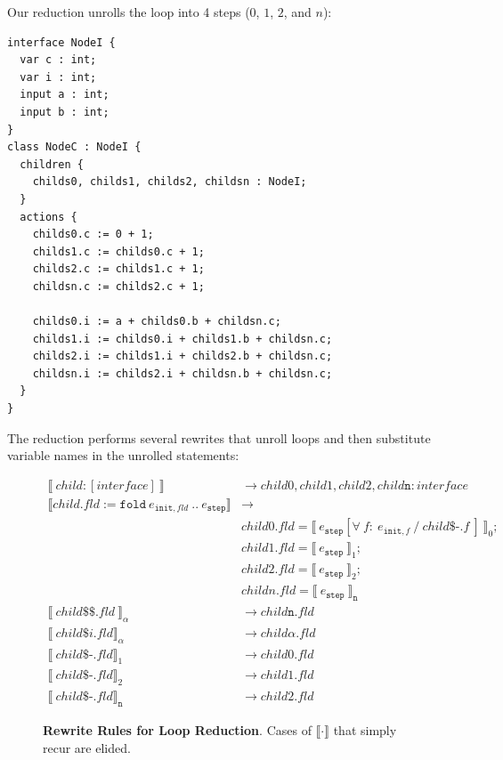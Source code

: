 Our reduction unrolls the loop into 4 steps ($0$, $1$, $2$, and $n$):

\begin{lstlisting}[mathescape]
interface NodeI {
  var c : int;
  var i : int;
  input a : int;
  input b : int;
}
class NodeC : NodeI {
  children {  
    childs0, childs1, childs2, childsn : NodeI;
  }
  actions {   
    childs0.c := 0 + 1;
    childs1.c := childs0.c + 1;
    childs2.c := childs1.c + 1;
    childsn.c := childs2.c + 1;

    childs0.i := a + childs0.b + childsn.c;
    childs1.i := childs0.i + childs1.b + childsn.c;
    childs2.i := childs1.i + childs2.b + childsn.c;
    childsn.i := childs2.i + childsn.b + childsn.c;
  }
}        
\end{lstlisting}



The reduction performs several rewrites that unroll loops and then substitute variable names in the unrolled statements:

\begin{figure}
\begin{align*}
\llbracket ~child : [ interface ] ~\rrbracket &\rightarrow child0, child1, child2, child \texttt{n} : interface 
\\
\llbracket child.fld := \texttt{fold} ~ e_{\texttt{init},fld} ~ .. ~ e_\texttt{step} \rrbracket &\rightarrow 
\\
& child0.fld = \llbracket~e_\texttt{step}[\forall ~f:  ~ e_{\texttt{init},f} ~/~ child\$\texttt{-}.f~]~\rrbracket_0; 
\\
& child1.fld = \llbracket~e_\texttt{step}~\rrbracket_1; 
\\
& child2.fld = \llbracket~e_\texttt{step}~\rrbracket_2; 
\\
& childn.fld = \llbracket~e_\texttt{step}~\rrbracket_\texttt{n} 
\\
\llbracket ~child\$\$.fld ~\rrbracket_\alpha &\rightarrow child \texttt{n}. fld
\\
\llbracket ~child\$i.fld \rrbracket_\alpha & \rightarrow child\alpha.fld
\\
\llbracket ~child\$\texttt{-}.fld \rrbracket_1 & \rightarrow child0.fld
\\
\llbracket ~child\$\texttt{-}.fld \rrbracket_2 & \rightarrow child1.fld
\\
\llbracket ~child\$\texttt{-}.fld \rrbracket_\texttt{n} & \rightarrow child2.fld
\end{align*}
\caption{\textbf{Rewrite Rules for Loop Reduction}. Cases of $\llbracket \cdot \rrbracket$ that simply recur are elided.}
\label{fig:loopreduction}
\end{figure}



